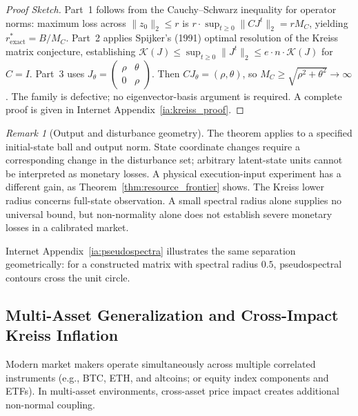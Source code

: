 \documentclass[12pt]{article}
\theoremstyle{definition}
\theoremstyle{remark}
\newtheorem{remark}[theorem]{Remark}
\begin{document}
\begin{proof}[Proof Sketch]
Part~1 follows from the Cauchy--Schwarz inequality for operator norms: maximum loss across $\|z_0\|_2 \le r$ is $r \cdot \sup_{t \ge 0} \|C J^t\|_2 = r M_C$, yielding $r^*_{\text{exact}} = B/M_C$. Part~2 applies Spijker's (1991) optimal resolution of the Kreiss matrix conjecture, establishing $\mathcal{K}(J) \le \sup_{t \ge 0} \|J^t\|_2 \le e \cdot n \cdot \mathcal{K}(J)$ for $C=I$. Part~3 uses $J_\theta=\left(\begin{smallmatrix}\rho&\theta\\0&\rho\end{smallmatrix}\right)$. Then $CJ_\theta=(\rho,\theta)$, so $M_C\ge\sqrt{\rho^2+\theta^2}\to\infty$. The family is defective; no eigenvector-basis argument is required. A complete proof is given in Internet Appendix~\ref{ia:kreiss_proof}.
\end{proof}

\begin{remark}[Output and disturbance geometry]
The theorem applies to a specified initial-state ball and output norm. State coordinate changes require a corresponding change in the disturbance set; arbitrary latent-state units cannot be interpreted as monetary losses. A physical execution-input experiment has a different gain, as Theorem~\ref{thm:resource_frontier} shows. The Kreiss lower radius concerns full-state observation. A small spectral radius alone supplies no universal bound, but non-normality alone does not establish severe monetary losses in a calibrated market.
\end{remark}

Internet Appendix~\ref{ia:pseudospectra} illustrates the same separation geometrically: for a constructed matrix with spectral radius $0.5$, pseudospectral contours cross the unit circle.

\subsection{Multi-Asset Generalization and Cross-Impact Kreiss Inflation}
Modern market makers operate simultaneously across multiple correlated instruments (e.g., BTC, ETH, and altcoins; or equity index components and ETFs). In multi-asset environments, cross-asset price impact creates additional non-normal coupling.
\end{document}
